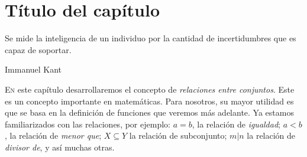 \chapter{Título del capítulo}\label{cap:05}
\pagecolor{white}
\BgThispage
\thispagestyle{empty}
\pagestyle{isfodosuCD}
\epigraph{Se mide la inteligencia de un individuo por la cantidad de incertidumbres que es capaz de soportar.}{Immanuel 
Kant}

\lettrine[lraise=0, lines=4, loversize=0]{\textcolor{azulF}{E}}{n} este capítulo desarrollaremos el concepto de 
\textit{relaciones entre conjuntos}. Este es un concepto importante en matemáticas. Para nosotros, su mayor utilidad es 
que se basa en la definición de funciones que veremos más adelante. Ya estamos familiarizados con las relaciones, por 
ejemplo: $a=b$, la relación de \textit{igualdad}; $a<b$, la relación de \textit{menor que}; $X\subseteq Y$ la relación 
de subconjunto; $m|n$ la relación de \textit{divisor de}, y así muchas otras.

{}
\pagestyle{probprop}
\pagecolor{paginaprob}

